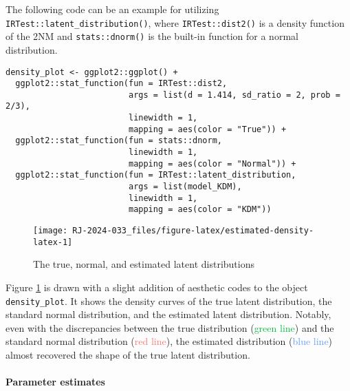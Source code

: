 The following code can be an example for utilizing \texttt{IRTest::latent\_distribution()},
where \texttt{IRTest::dist2()} is a density function
of the 2NM and \texttt{stats::dnorm()} is the built-in function for a normal distribution.

\begin{verbatim}
density_plot <- ggplot2::ggplot() +
  ggplot2::stat_function(fun = IRTest::dist2,
                         args = list(d = 1.414, sd_ratio = 2, prob = 2/3),
                         linewidth = 1,
                         mapping = aes(color = "True")) +
  ggplot2::stat_function(fun = stats::dnorm,
                         linewidth = 1,
                         mapping = aes(color = "Normal")) +
  ggplot2::stat_function(fun = IRTest::latent_distribution,
                         args = list(model_KDM),
                         linewidth = 1,
                         mapping = aes(color = "KDM"))
\end{verbatim}

\begin{figure}[H]

{\centering \texttt{[image: RJ-2024-033\_files/figure-latex/estimated-density-latex-1]} 

}

\caption{The true, normal, and estimated latent distributions}\label{fig:estimated-density-latex}
\end{figure}

Figure
\ref{fig:estimated-density-latex}
is drawn with a slight addition of aesthetic codes to the object
\texttt{density\_plot}. It shows the density curves of the true latent distribution, the standard normal
distribution, and the estimated latent distribution. Notably, even with the
discrepancies between the true distribution
(\textcolor[HTML]{00BA38}{green line})
and the standard normal distribution
(\textcolor[HTML]{F8766D}{red line}),
the estimated distribution
(\textcolor[HTML]{619CFF}{blue line})
almost recovered the shape of the true latent distribution.

\hypertarget{parameter-estimates}{%
\paragraph{Parameter estimates}\label{parameter-estimates}}

